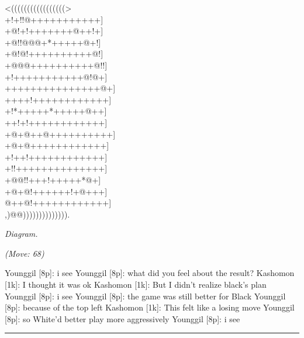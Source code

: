 \documentclass[letterpaper,12pt]{memoir}
\newcounter{GoFigure}[part]
\newcommand{\gofigure}{%
 \stepcounter{GoFigure}
 \centerline{\textit{Diagram.\thinspace\arabic{GoFigure}}}
}
\newcommand{\subtext}[1]{\centerline{\textit{#1}}}
\begin{document}
\begin{minipage}[t]{0.5\textwidth}
{\gnos
<(((((((((((((((((>\\
+!+!!@+++++++++++]\\
+@!+!+++++++@++!+]\\
+@!!@@@+*+++++@+!]\\
+@!@!++++++++++@!]\\
+@@@++++++++++@!!]\\
+!+++++++++++@!@+]\\
+++++++++++++++@+]\\
++++!++++++++++++]\\
+!*+++++*+++++@++]\\
++!+!++++++++++++]\\
+@+@++@++++++++++]\\
+@+@++++++++++++]\\
+!++!++++++++++++]\\
+!!++++++++++++++]\\
+@@!!+++!+++++*@+]\\
+@+@!++++++!+@+++]\\
@++@!++++++++++++]\\
,)@@)))))))))))))).\\
}
\gofigure

\subtext{(Move: 68)}
\end{minipage}
\begin{minipage}[t]{0.5\textwidth}
\setlength{\parskip}{0.5em}
Younggil [8p]: i see
Younggil [8p]: what did you feel about the result?
Kashomon [1k]: I thought it was ok
Kashomon [1k]: But I didn't realize black's plan
Younggil [8p]: i see
Younggil [8p]: the game was still better for Black
Younggil [8p]: because of the top left
Kashomon [1k]: This felt like a losing move
Younggil [8p]: so White'd better play more aggressively
Younggil [8p]: i see


\end{minipage}
\vfill

\rule{\textwidth}{0.5pt}
\end{document}
